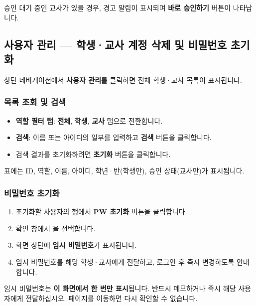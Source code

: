 \documentclass[a4paper,12pt]{article}
\newcommand{\menu}[1]{\textcolor{primary}{\textbf{#1}}}
\newcommand{\key}[1]{\fbox{\small\texttt{#1}}}
\begin{document}
\begin{tipbox}
  승인 대기 중인 교사가 있을 경우, 경고 알림이 표시되며 \menu{바로 승인하기} 버튼이 나타납니다.
\end{tipbox}

\subsection{사용자 관리 --- 학생·교사 계정 삭제 및 비밀번호 초기화}

상단 네비게이션에서 \menu{사용자 관리}를 클릭하면 전체 학생·교사 목록이 표시됩니다.

\subsubsection{목록 조회 및 검색}

\begin{itemize}[leftmargin=1.5em]
    \item \textbf{역할 필터 탭}: \menu{전체}, \menu{학생}, \menu{교사} 탭으로 전환합니다.
    \item \textbf{검색}: 이름 또는 아이디의 일부를 입력하고 \menu{검색} 버튼을 클릭합니다.
    \item 검색 결과를 초기화하려면 \menu{초기화} 버튼을 클릭합니다.
\end{itemize}

표에는 ID, 역할, 이름, 아이디, 학년·반(학생만), 승인 상태(교사만)가 표시됩니다.

\subsubsection{비밀번호 초기화}

\begin{enumerate}[leftmargin=1.5em]
    \item 초기화할 사용자의 행에서 \menu{PW 초기화} 버튼을 클릭합니다.
    \item 확인 창에서 \key{확인}을 선택합니다.
    \item 화면 상단에 \textbf{임시 비밀번호}가 표시됩니다.
    \item 임시 비밀번호를 해당 학생·교사에게 전달하고, 로그인 후 즉시 변경하도록 안내합니다.
\end{enumerate}

\begin{warnbox}
  임시 비밀번호는 \textbf{이 화면에서 한 번만 표시}됩니다. 반드시 메모하거나
  즉시 해당 사용자에게 전달하십시오. 페이지를 이동하면 다시 확인할 수 없습니다.
\end{warnbox}
\end{document}
